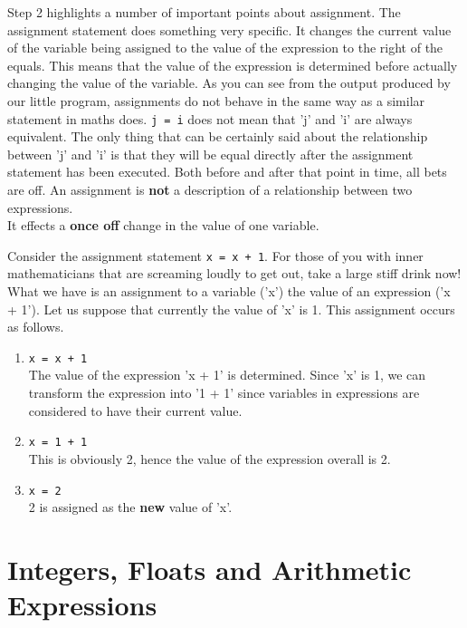 Step 2 highlights a number of important points about assignment. The   assignment statement does something very specific. It changes the   current value of the variable being assigned to the value of the   expression to the right of the equals. This means that the value of the   expression is determined before actually changing the value of the   variable. As you can see from the output produced by our little   program, assignments do not behave in the same way as a   similar statement in maths does. 
\texttt{j = i} does not mean that   'j' and 'i' are always equivalent. The only thing that can be certainly   said about the relationship between 'j' and 'i' is that they will be   equal directly after the assignment statement has been executed. Both   before and after that point in time, all bets are off.     An assignment is \textbf{not} a description of a    relationship between two expressions.
\\ It effects a    \textbf{once off} change in the value of one variable.    

Consider the assignment statement 
\texttt{x = x + 1}. For those   of you with inner mathematicians that are screaming loudly to get out,   take a large stiff drink now! What we have is an assignment to a   variable ('x') the value of an expression ('x + 1'). Let us suppose   that currently the value of 'x' is 1. This assignment occurs as   follows.
\begin{enumerate}
	\item 
\texttt{x = x + 1}
\\     The value of the expression 'x + 1' is determined. Since 'x' is 1, we can transform the expression into '1 + 1' since variables in expressions are considered to have their    current value.
	\item 
\texttt{x = 1 + 1}
\\     This is obviously 2, hence the value of the expression overall is    2.
	\item 
\texttt{x = 2}
\\      2 is assigned as the \textbf{new} value of 'x'.
\end{enumerate}

\section{Integers, Floats and Arithmetic Expressions}

